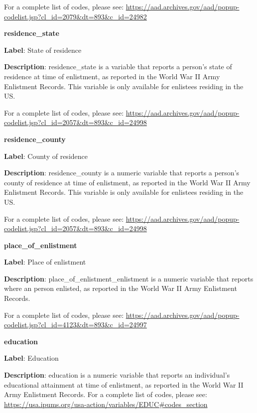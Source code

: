 \documentclass[
]{article}
\begin{document}
For a complete list of codes, please see:
\url{https://aad.archives.gov/aad/popup-codelist.jsp?cl_id=2079\&dt=893\&c_id=24982}

\newpage

\textbf{\huge residence\_state } \normalsize \vspace{12pt}

\textbf{Label}: State of residence

\textbf{Description}: residence\_state is a variable that reports a
person's state of residence at time of enlistment, as reported in the
World War II Army Enlistment Records. This variable is only available
for enlistees residing in the US.

For a complete list of codes, please see:
\url{https://aad.archives.gov/aad/popup-codelist.jsp?cl_id=2057\&dt=893\&c_id=24998}

\newpage

\textbf{\huge residence\_county } \normalsize \vspace{12pt}

\textbf{Label}: County of residence

\textbf{Description}: residence\_county is a numeric variable that
reports a person's county of residence at time of enlistment, as
reported in the World War II Army Enlistment Records. This variable is
only available for enlistees residing in the US.

For a complete list of codes, please see:
\url{https://aad.archives.gov/aad/popup-codelist.jsp?cl_id=2057\&dt=893\&c_id=24998}

\newpage

\textbf{\huge place\_of\_enlistment } \normalsize \vspace{12pt}

\textbf{Label}: Place of enlistment

\textbf{Description}: place\_of\_enlistment\_enlistment is a numeric
variable that reports where an person enlisted, as reported in the World
War II Army Enlistment Records.

For a complete list of codes, please see:
\url{https://aad.archives.gov/aad/popup-codelist.jsp?cl_id=4123\&dt=893\&c_id=24997}

\newpage

\textbf{\huge education } \normalsize \vspace{12pt}

\textbf{Label}: Education

\textbf{Description}: education is a numeric variable that reports an
individual's educational attainment at time of enlistment, as reported
in the World War II Army Enlistment Records. For a complete list of
codes, please see:
\url{https://usa.ipums.org/usa-action/variables/EDUC\#codes_section}
\end{document}
